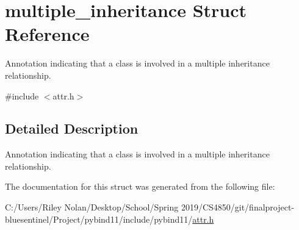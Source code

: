 \hypertarget{structmultiple__inheritance}{}\section{multiple\+\_\+inheritance Struct Reference}
\label{structmultiple__inheritance}


Annotation indicating that a class is involved in a multiple inheritance relationship.  




{\ttfamily \#include $<$attr.\+h$>$}



\subsection{Detailed Description}
Annotation indicating that a class is involved in a multiple inheritance relationship. 

The documentation for this struct was generated from the following file\+:\begin{DoxyCompactItemize}
\item 
C\+:/\+Users/\+Riley Nolan/\+Desktop/\+School/\+Spring 2019/\+C\+S4850/git/finalproject-\/bluesentinel/\+Project/pybind11/include/pybind11/\mbox{\hyperlink{attr_8h}{attr.\+h}}\end{DoxyCompactItemize}
